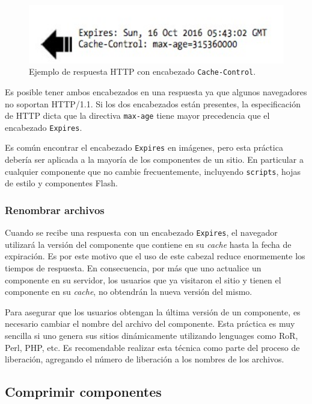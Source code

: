 \documentclass[a4paper,12pt]{report}
\begin{document}
\begin{figure}[h]
\centering
\includegraphics[width=1\textwidth]{figuras/hpws/cache-control.jpg}
  \caption{Ejemplo de respuesta HTTP con encabezado \texttt{Cache-Control}.}
    \label{fig.cache-control}
\end{figure}

Es posible tener ambos encabezados en una respuesta ya que algunos navegadores no soportan HTTP/1.1. Si los dos encabezados están presentes, la especificación
de HTTP dicta que la directiva \texttt{max-age} tiene mayor precedencia que el encabezado \texttt{Expires}.

Es común encontrar el encabezado \texttt{Expires} en imágenes, pero esta práctica debería ser aplicada a la mayoría de los componentes de un sitio. En particular
a cualquier componente que no cambie frecuentemente, incluyendo \texttt{scripts}, hojas de estilo
y componentes Flash.

\subsubsection{Renombrar archivos}

Cuando se recibe una respuesta con un encabezado \texttt{Expires}, el navegador utilizará la versión del componente que contiene en su \emph{cache} hasta
la fecha de expiración. Es por este motivo que el uso de este cabezal reduce enormemente los tiempos de respuesta. En consecuencia, por más que uno actualice un componente
en su servidor, los usuarios que ya visitaron el sitio y tienen el componente en su \emph{cache}, no obtendrán la nueva versión del mismo.

Para asegurar que los usuarios obtengan la última versión de un componente, es necesario cambiar el nombre del archivo del componente. Esta práctica es muy
sencilla si uno genera sus sitios dinámicamente utilizando lenguages como RoR, Perl, PHP, etc. Es recomendable realizar esta técnica como parte del proceso de liberación,
agregando el número de liberación a los nombres de los archivos.

\subsection{Comprimir componentes}
\end{document}
